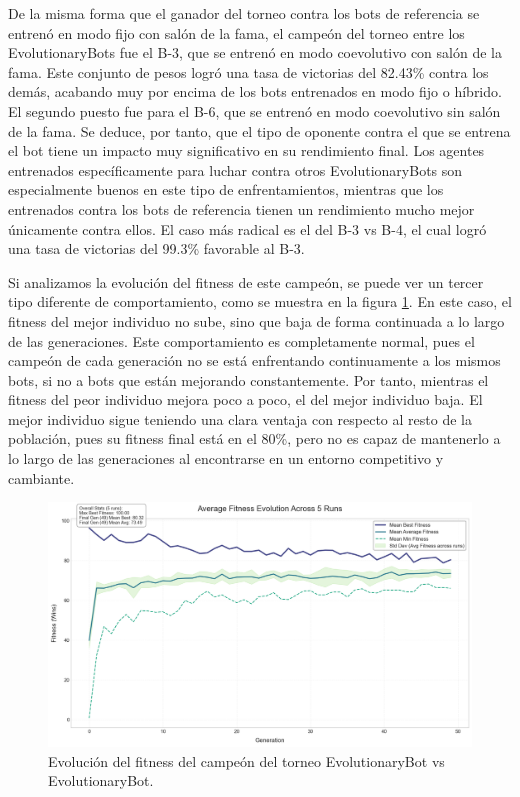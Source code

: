De la misma forma que el ganador del torneo contra los bots de referencia se entrenó en modo fijo con salón de la fama, el campeón del torneo entre los EvolutionaryBots fue el B-3, que se entrenó en modo coevolutivo con salón de la fama. Este conjunto de pesos logró una tasa de victorias del 82.43\% contra los demás, acabando muy por encima de los bots entrenados en modo fijo o híbrido. El segundo puesto fue para el B-6, que se entrenó en modo coevolutivo sin salón de la fama. Se deduce, por tanto, que el tipo de oponente contra el que se entrena el bot tiene un impacto muy significativo en su rendimiento final. Los agentes entrenados específicamente para luchar contra otros EvolutionaryBots son especialmente buenos en este tipo de enfrentamientos, mientras que los entrenados contra los bots de referencia tienen un rendimiento mucho mejor únicamente contra ellos. El caso más radical es el del B-3 vs B-4, el cual logró una tasa de victorias del 99.3\% favorable al B-3.

Si analizamos la evolución del fitness de este campeón, se puede ver un tercer tipo diferente de comportamiento, como se muestra en la figura \ref{fig:coevo_fitness_evolution}. En este caso, el fitness del mejor individuo no sube, sino que baja de forma continuada a lo largo de las generaciones. Este comportamiento es completamente normal, pues el campeón de cada generación no se está enfrentando continuamente a los mismos bots, si no a bots que están mejorando constantemente. Por tanto, mientras el fitness del peor individuo mejora poco a poco, el del mejor individuo baja. El mejor individuo sigue teniendo una clara ventaja con respecto al resto de la población, pues su fitness final está en el 80\%, pero no es capaz de mantenerlo a lo largo de las generaciones al encontrarse en un entorno competitivo y cambiante.

\begin{figure}[H]
	\centering
	\includegraphics[width=1.0\textwidth]{img/coevo_fitness_evolution.png}
	\caption{Evolución del fitness del campeón del torneo EvolutionaryBot vs EvolutionaryBot.}
	\label{fig:coevo_fitness_evolution}
\end{figure}

